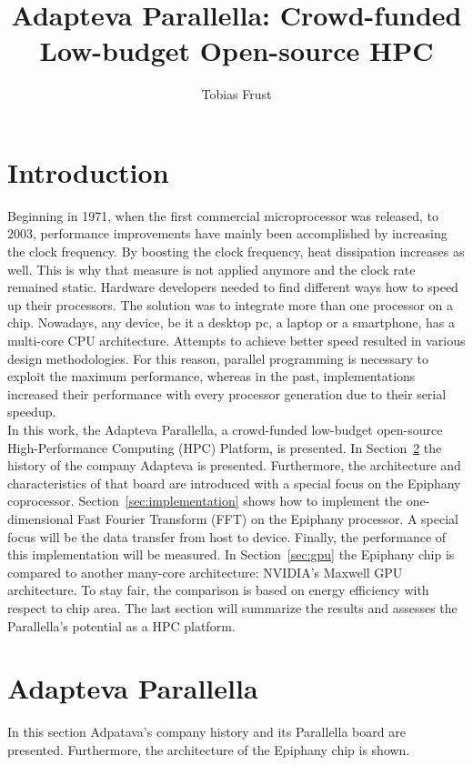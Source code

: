\documentclass[american, hauptseminar, twoside]{zihpub}
\author{Tobias Frust}
\title{Adapteva Parallella: Crowd-funded Low-budget Open-source HPC}
\begin{document}
	\section{Introduction}
		Beginning in 1971, when the first commercial microprocessor was released, to 2003, performance improvements have mainly been accomplished by increasing the clock frequency. By boosting the clock frequency, heat dissipation increases as well. This is why that measure is not applied anymore and the clock rate remained static. Hardware developers needed to find different ways how to speed up their processors. The solution was to integrate more than one processor on a chip. Nowadays, any device, be it a desktop pc, a laptop or a smartphone, has a multi-core CPU architecture. Attempts to achieve better speed resulted in various design methodologies. For this reason, parallel programming is necessary to exploit the maximum performance, whereas in the past, implementations increased their performance with every processor generation due to their serial speedup. 
		\\
		In this work, the Adapteva Parallella, a crowd-funded low-budget open-source High-Performance Computing (HPC) Platform, is presented. In Section~\ref{sec:parallella} the history of the company Adapteva is presented. Furthermore, the architecture and characteristics of that board are introduced with a special focus on the Epiphany coprocessor.
		Section~\ref{sec:implementation} shows how to implement the one-dimensional Fast Fourier Transform (FFT) on the Epiphany processor. A special focus will be the data transfer from host to device. Finally, the performance of this implementation will be measured.
		In Section~\ref{sec:gpu} the Epiphany chip is compared to another many-core architecture: NVIDIA's Maxwell GPU architecture. To stay fair, the comparison is based on energy efficiency with respect to chip area. The last section will summarize the results and assesses the Parallella's potential as a HPC platform.
		
		\clearpage
	\section{Adapteva Parallella}
		\label{sec:parallella} 
		In this section Adpatava's company history and its Parallella board are presented. Furthermore, the architecture of the Epiphany chip is shown.
\end{document}
